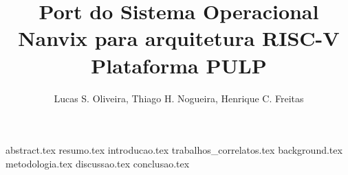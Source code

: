 \documentclass[12pt]{article}
\title{Port do Sistema Operacional Nanvix para arquitetura RISC-V Plataforma PULP}
\author{Lucas S. Oliveira, Thiago H. Nogueira, Henrique C. Freitas}
\begin{document}
    \maketitle

    {abstract.tex}
    {resumo.tex}
    {introducao.tex}
    {trabalhos_correlatos.tex}
    {background.tex}
    {metodologia.tex}
    {discussao.tex}
    {conclusao.tex}
    
    
    
\end{document}
